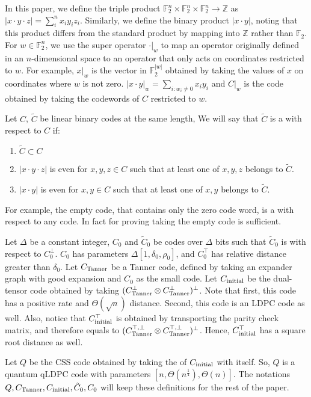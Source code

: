\documentclass[manuscript,screen,review]{acmart}
\begin{document}
In this paper, we define the triple product $\mathbb{F}_2^{n}\times \mathbb{F}_2^{n}\times\mathbb{F}_2^{n} \rightarrow \mathbb{Z}$ as $|x\cdot y \cdot z| = \sum_{i}^{n}{x_{i}y_{i}z_{i}}$. Similarly, we define the binary product $|x \cdot y|$, noting that this product differs from the standard product by mapping into $\mathbb{Z}$ rather than $\mathbb{F}_{2}$. For $w \in \mathbb{F}_{2}^{n}$, we use the super operator $ \cdot |_{w} $ to map an operator originally defined in an $n$-dimensional space to an operator that only acts on coordinates restricted to $w$. For example, $x|_{w}$ is the vector in $\mathbb{F}_{2}^{|w|}$ obtained by taking the values of $x$ on coordinates where $w$ is not zero. $|x\cdot y|_{w} = \sum_{i:w_{i}\neq 0}{x_{i}y_{i}}$ and $C|_{w}$ is the code obtained by taking the codewords of $C$ restricted to $w$.

\begin{definition}
  Let $C$, $\tilde{C}$ be linear binary codes at the same length, We will say that $\tilde{C}$ is a \trig with respect to $C$ if: 
  \begin{enumerate}
    \item $\tilde{C} \subset C$
    \item $|x\cdot y \cdot z|$ is even for $x,y,z \in C$ such that at least one of $x,y,z$  belongs to $\tilde{C}$. 
    \item $|x\cdot y|$ is even for $x,y \in C$ such that at least one of $x,y$  belongs to $\tilde{C}$. 
  \end{enumerate}
  For example, the empty code, that contains only the zero code word, is a \trig with respect to any code. In fact for proving  taking the empty code is sufficient.  
\end{definition}

\begin{definition}
  \label{def:thecode}
Let $\Delta$ be a constant integer, $C_{0}$ and $\tilde{C}_{0}$ be codes over $\Delta$ bits such that $\tilde{C}_{0}$ is \trig with respect to $C^{\perp}_{0}$. $C_{0}$ has parameters $\Delta[1,\delta_{0},\rho_{0}]$, and $C_{0}^\top$ has relative distance greater than $\delta_{0}$. Let $C_{\text{Tanner}}$ be a Tanner code, defined by taking an expander graph with good expansion and $C_{0}$ as the small code. Let $C_{\text{initial}}$ be the dual-tensor code obtained by taking $(C_{\text{Tanner}}^\perp \otimes C_{\text{Tanner}}^\perp )^\perp$. Note that first, this code has a positive rate and $\Theta(\sqrt{n})$ distance. Second, this code is an LDPC code as well. Also, notice that $C_{\text{initial}}^{\top}$ is obtained by transporting the parity check matrix, and therefore equals to $(C_{\text{Tanner}}^{\top, \perp} \otimes C_{\text{Tanner}}^{\top, \perp} )^\perp$. Hence, $C_{\text{initial}}^{\top}$ has a square root distance as well.

Let $Q$ be the CSS code obtained by taking the \Hyp of $C_{\text{initial}}$ with itself. So, $Q$ is a quantum qLDPC code with parameters $[n, \Theta(n^{\frac{1}{4}}), \Theta(n)]$. The notations $Q,C_{\text{Tanner}}, C_{\text{initial}}, \tilde{C}_{0}, C_{0}$ will keep these definitions for the rest of the paper.
\end{definition}
\end{document}
